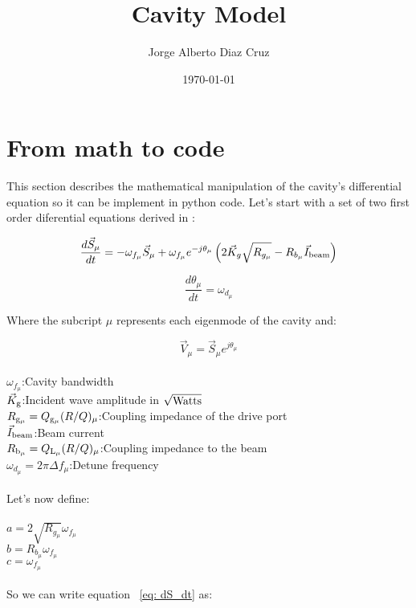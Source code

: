 \documentclass[a4paper,12pt]{article}
\begin{document}
\title{\textbf{Cavity Model}}
\author{Jorge Alberto Diaz Cruz}
\date{\today}
\maketitle
\setcounter{tocdepth}{2}
\tableofcontents
\newpage
\section{From math to code}
This section describes the mathematical manipulation of the cavity's differential equation so it can be implement in python code. Let's start with a set of two first order diferential equations derived in \cite{ref:LCLS-II System Simulations}:

\begin{equation}
  \frac{d\vec{S}_{\mu}}{dt} = -\omega_{f_{\mu}}\vec{S}_{\mu} + \omega_{f_{\mu}}e^{-j\theta_{\mu}}\left(2\vec{K}_g\sqrt{R_{g_{\mu}}}
    - R_{b_{\mu}}\vec{I}_{\rm beam} \right)
\label{eq: dS_dt}
\end{equation}	

\begin{equation}
\frac{d\theta_{\mu}}{dt} = \omega_{d_\mu}
\label{eq: d0_dt}
\end{equation}

Where the subcript $\mu$ represents each eigenmode of the cavity and:

\begin{equation}
\vec{V}_{\mu} = \vec{S}_{\mu}e^{j\theta_{\mu}}
\label{eq:V_mu}
\end{equation}
\\
$\omega_{f_{\mu}}$:\tab Cavity bandwidth
\\$\vec K_{\rm g}$:\tab Incident wave amplitude in $\sqrt{\rm Watts}$
\\$R_{\rm g_{\mu}}=Q_{\rm g_{\mu}}(R/Q)_{\mu}$:\tab Coupling impedance of the drive port
\\$\vec I_{\rm beam}$:\tab Beam current
\\$R_{\rm b_{\mu}}=Q_{\rm L_{\mu}}(R/Q)_{\mu}$:\tab Coupling impedance to the beam
\\$\omega_{d_{\mu}}=2\pi\Delta f_{\mu}$:\tab Detune frequency
\\
\\Let's now define:
\\
\\$a=2\sqrt{R_{g_{\mu}}}\omega_{f_{\mu}}$
\\$b=R_{b_{\mu}}\omega_{f_{\mu}}$
\\$c=\omega_{f_{\mu}}$
\\
\\So we can write equation ~\ref{eq: dS_dt} as:
\end{document}

